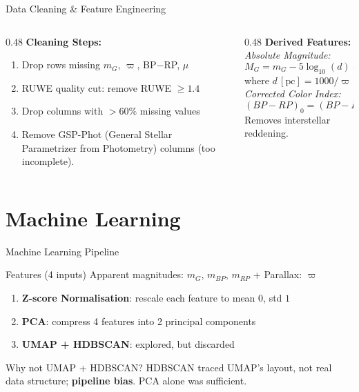 \documentclass[aspectratio=169]{beamer}
\begin{document}
\begin{frame}{Data Cleaning \& Feature Engineering}
  \begin{columns}[T]
    \begin{column}{0.48\textwidth}
      \textbf{Cleaning Steps:}
      \begin{enumerate}
        \item Drop rows missing $m_G$, $\varpi$, BP$-$RP, $\mu$
        \item RUWE quality cut: remove RUWE $\geq 1.4$ \cite{pearce2022ruwe}
        \item Drop columns with $>60\%$ missing values
        \item Remove GSP-Phot (General Stellar Parametrizer from Photometry) columns (too incomplete). 
      \end{enumerate}
    \end{column}
    \begin{column}{0.48\textwidth}
      \textbf{Derived Features:}\\[0.8em]
      \textit{Absolute Magnitude:}
      \[
        M_G = m_G - 5\log_{10}(d) + 5 - A_G
      \]
      where $d\,[\text{pc}] = 1000/\varpi$\\[1em]
      \textit{Corrected Color Index:}
      \[
        (BP-RP)_0 = (BP-RP) - E(BP-RP)
      \]
      Removes interstellar reddening.
    \end{column}
  \end{columns}
\end{frame}

\section{Machine Learning}

\begin{frame}{Machine Learning Pipeline}
  \begin{block}{Features (4 inputs)}
    Apparent magnitudes: $m_G$,\; $m_{BP}$,\; $m_{RP}$ \quad + \quad Parallax: $\varpi$
  \end{block}
  \vspace{0.5em}
  \begin{enumerate}
    \item \textbf{Z-score Normalisation}: rescale each feature to mean $0$, std $1$
    \item \textbf{PCA}: compress 4 features into 2 principal components
    \item \textbf{UMAP + HDBSCAN}: explored, but discarded
  \end{enumerate}
  \vspace{0.5em}
  \begin{alertblock}{Why not UMAP + HDBSCAN?}
    HDBSCAN traced UMAP's layout, not real data structure; \textbf{pipeline bias}. PCA alone was sufficient.
  \end{alertblock}
\end{frame}
\end{document}
